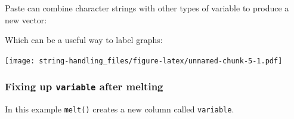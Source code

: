 \documentclass[]{article}
\newenvironment{Shaded}{\begin{snugshade}}{\end{snugshade}}
\newcommand{\DecValTok}[1]{\textcolor[rgb]{0.00,0.00,0.81}{#1}}
\newcommand{\KeywordTok}[1]{\textcolor[rgb]{0.13,0.29,0.53}{\textbf{#1}}}
\newcommand{\NormalTok}[1]{#1}
\newcommand{\OperatorTok}[1]{\textcolor[rgb]{0.81,0.36,0.00}{\textbf{#1}}}
\newcommand{\StringTok}[1]{\textcolor[rgb]{0.31,0.60,0.02}{#1}}
\begin{document}
Paste can combine character strings with other types of variable to produce a
new vector:

\begin{Shaded}
\end{Shaded}

Which can be a useful way to label graphs:

\begin{Shaded}
\end{Shaded}

\texttt{[image: string-handling\_files/figure-latex/unnamed-chunk-5-1.pdf]}

\hypertarget{separate-and-extract}{%
\subsubsection*{\texorpdfstring{Fixing up \texttt{variable} after melting}{Fixing up variable after melting}}\label{separate-and-extract}}

In this example \texttt{melt()} creates a new column called \texttt{variable}.
\end{document}
